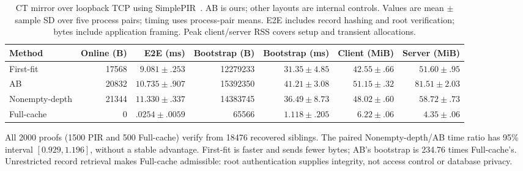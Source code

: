 \begin{table}[t]
\centering\small\setlength{\tabcolsep}{5pt}
\caption{CT mirror over loopback TCP using SimplePIR~\cite{simplepir}. AB is ours; other layouts are internal controls. Values are mean $\pm$ sample SD over five process pairs; timing uses process-pair means. E2E includes record hashing and root verification; bytes include application framing. Peak client/server RSS covers setup and transient allocations.}
\label{tab:ct_application_tcp}
\begin{tabular}{lrrrrrr}
\toprule
Method & Online (B) & E2E (ms) & Bootstrap (B) & Bootstrap (ms) & Client (MiB) & Server (MiB)\\
\midrule
First-fit & 17568 & $9.081\pm.253$ & 12279233 & $31.35\pm4.85$ & $42.55\pm.66$ & $51.60\pm.95$\\
AB & 20832 & $10.735\pm.907$ & 15392350 & $41.21\pm3.08$ & $51.15\pm.32$ & $81.51\pm2.03$\\
Nonempty-depth & 21344 & $11.330\pm.337$ & 14383745 & $36.49\pm8.73$ & $48.02\pm.60$ & $58.72\pm.73$\\
Full-cache & 0 & $.0254\pm.0059$ & 65566 & $1.118\pm.205$ & $6.22\pm.06$ & $4.35\pm.06$\\
\bottomrule
\end{tabular}
\end{table}

All 2000 proofs (1500 PIR and 500 Full-cache) verify from 18476 recovered siblings. The paired Nonempty-depth/AB time ratio has 95\% interval $[0.929,1.196]$, without a stable advantage. First-fit is faster and sends fewer bytes; AB's bootstrap is 234.76 times Full-cache's. Unrestricted record retrieval makes Full-cache admissible: root authentication supplies integrity, not access control or database privacy.
